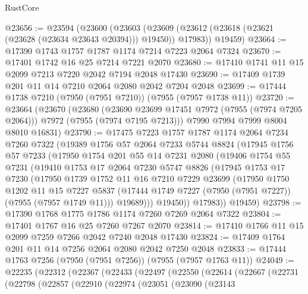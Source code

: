\begin{lexlean}{RustCore}
\begin{coremodule}
@23656 := @23594
    (@23600
      (@23603 (@23609 (@23612 (@23618 (@23621 (@23628 (@23634 @23643 @20394))) @19450)) @17983))
      @19459)
@23664 := @17390 @1743 @1757 @1787 @1174 @7214 @7223 @2064 @7324
@23670 := @17401 @1742 @16 @25 @7214 @7221 @2070
@23680 := @17410 @1741 @11 @15 @2099 @7213 @7220 @2042 @7194 @2048 @17430
@23690 := @17409 @1739 @201 @11 @14 @7210 @2064 @2080 @2042 @7204 @2048
@23699 := @17444 @1738 @7210 (@7950 (@7951 @7210)) (@7955 (@7957 @1738 @11))
@23720 := @23664
    (@23670
      (@23680
        (@23690 @23699 @17451 @7972 (@7955 (@7974 @7205 @2064)))
        @7972
        (@7955 (@7974 @7195 @7213)))
      @7990
      @7994
      @7999
      @8004
      @8010
      @16831)
@23790 := @17475
    @7223
    @1757
    @1787
    @1174
    @2064
    @7234
    @7260
    @7322
    (@19389
      @1756
      @57
      @2064
      @7233
      @5744
      @8824
      (@17945
        @1756
        @57
        @7233
        (@17950
          @1754
          @201
          @55
          @14
          @7231
          @2080
          (@19406
            @1754
            @55
            @7231
            (@19410
              @1753
              @17
              @2064
              @7230
              @5747
              @8826
              (@17945
                @1753
                @17
                @7230
                (@17950
                  @1739
                  @1752
                  @11
                  @16
                  @7210
                  @7229
                  @23699
                  (@17950
                    @1750
                    @1202
                    @11
                    @15
                    @7227
                    @5837
                    (@17444 @1749 @7227 (@7950 (@7951 @7227)) (@7955 (@7957 @1749 @11)))
                    @19689)))
              @19450))
          @17983))
      @19459)
@23798 := @17390 @1768 @1775 @1786 @1174 @7260 @7269 @2064 @7322
@23804 := @17401 @1767 @16 @25 @7260 @7267 @2070
@23814 := @17410 @1766 @11 @15 @2099 @7259 @7266 @2042 @7240 @2048 @17430
@23824 := @17409 @1764 @201 @11 @14 @7256 @2064 @2080 @2042 @7250 @2048
@23833 := @17444 @1763 @7256 (@7950 (@7951 @7256)) (@7955 (@7957 @1763 @11))
@24049 := @22235
    (@22312
      (@22367
        (@22433
          (@22497
            (@22550
              (@22614
                (@22667
                  (@22731
                    (@22798
                      (@22857
                        (@22910
                          (@22974
                            (@23051
                              (@23090
                                (@23143

\end{coremodule}
\end{lexlean}
